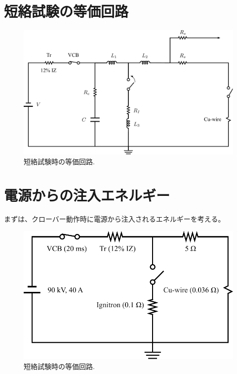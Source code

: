\documentclass[book,openany]{jlreq}
\theoremstyle{definition}
\begin{document}
\section{短絡試験の等価回路}
\begin{figure}[htbp]
  \begin{center}
    \includegraphics[width=12cm]{figs/Equivalent_Circuit.pdf}
    \caption{短絡試験時の等価回路.}
    \label{fig:Equivalent_Circuit}
  \end{center}
\end{figure}

\section{電源からの注入エネルギー}
%
まずは、クローバー動作時に電源から注入されるエネルギーを考える。

\begin{figure}[htbp]
  \begin{center}
    \includegraphics[width=12cm]{figs/FromPS.pdf}
    \caption{短絡試験時の等価回路.}
    \label{fig:FromPS}
  \end{center}
\end{figure}
\end{document}
